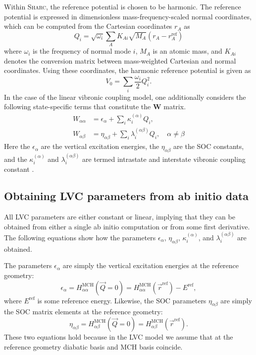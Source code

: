 \documentclass[a4paper,10pt,DIV=15,openany]{scrbook}
\newcommand{\sharc}{\textsc{Sharc}}
\begin{document}
Within \sharc, the reference potential is chosen to be harmonic.
The reference potential is expressed in dimensionless mass-frequency-scaled normal coordinates, which can be computed from the Cartesian coordinates $r_{A}$ as
%
\begin{equation}
\label{eq:Qi}
Q_i=\sqrt{\omega_i}\sum_A K_{A i}\sqrt{M_A}\left(r_{A}-r_A^\text{ref}\right)
\end{equation}
%
where $\omega_i$ is the frequency of normal mode $i$, $M_A$ is an atomic mass, and $K_{A i}$ denotes the conversion matrix between mass-weighted Cartesian and normal coordinates.
Using these coordinates, the harmonic reference potential is given as
%
\begin{equation}
\label{eq:V0Qi}
V_0= \sum_i \dfrac{\omega_i}{2}Q_i^2.
\end{equation}
%
In the case of the linear vibronic coupling model, one additionally considers the following state-specific terms that constitute the $\mathbf{W}$ matrix.
%
\begin{align}
\label{eq:Wnn}
W_{\alpha\alpha}&=\epsilon_\alpha + \sum_i\kappa_i^{(\alpha)}Q_i,
\\
\label{eq:Wmn}
W_{\alpha\beta}&=\eta_{\alpha\beta}+\sum_i\lambda_i^{(\alpha\beta)}Q_i, \quad \alpha\neq \beta
\end{align}
%
Here the $\epsilon_\alpha$ are the vertical excitation energies, the $\eta_{\alpha\beta}$ are the SOC constants, and the $\kappa_i^{(\alpha)}$ and $\lambda_i^{(\alpha\beta)}$ are termed intrastate and interstate vibronic coupling constant \cite{Koeppel84ACP}.


\subsection{Obtaining LVC parameters from ab initio data}

All LVC parameters are either constant or linear, implying that they can be obtained from either a single ab initio computation or from some first derivative.
The following equations show how the parameters $\epsilon_\alpha$, $\eta_{\alpha\beta}$, $\kappa_i^{(\alpha)}$, and $\lambda_i^{(\alpha\beta)}$ are obtained.

The parameters $\epsilon_\alpha$ are simply the vertical excitation energies at the reference geometry:
\begin{equation}
  \epsilon_\alpha = H^\text{MCH}_{\alpha\alpha}(\vec{Q}=0) = H^\text{MCH}_{\alpha\alpha}(\vec{r}^\text{ref})-E^\text{ref},
\end{equation}
where $E^\text{ref}$ is some reference energy.
Likewise, the SOC parameters $\eta_{\alpha\beta}$ are simply the SOC matrix elements at the reference geometry:
\begin{equation}
  \eta_{\alpha\beta} = H^\text{MCH}_{\alpha\beta}(\vec{Q}=0) = H^\text{MCH}_{\alpha\beta}(\vec{r}^\text{ref}).
\end{equation}
These two equations hold because in the LVC model we assume that at the reference geometry diabatic basis and MCH basis coincide.
\end{document}
